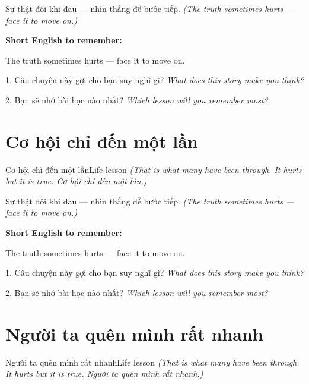 \begin{baihoc}
Sự thật đôi khi đau — nhìn thẳng để bước tiếp.
\textit{(The truth sometimes hurts — face it to move on.)}
\end{baihoc}

\begin{ghinhoanh}
\textbf{Short English to remember:}

The truth sometimes hurts — face it to move on.

\end{ghinhoanh}

\begin{tuhocnhanh}
1. Câu chuyện này gợi cho bạn suy nghĩ gì? \textit{What does this story make you think?}

2. Bạn sẽ nhớ bài học nào nhất? \textit{Which lesson will you remember most?}
\end{tuhocnhanh}
\ngancach


\section{Cơ hội chỉ đến một lần}
\begin{truyen}{Cơ hội chỉ đến một lần}{Life lesson}
\textit{(That is what many have been through. It hurts but it is true. Cơ hội chỉ đến một lần.)}
\end{truyen}

\begin{baihoc}
Sự thật đôi khi đau — nhìn thẳng để bước tiếp.
\textit{(The truth sometimes hurts — face it to move on.)}
\end{baihoc}

\begin{ghinhoanh}
\textbf{Short English to remember:}

The truth sometimes hurts — face it to move on.

\end{ghinhoanh}

\begin{tuhocnhanh}
1. Câu chuyện này gợi cho bạn suy nghĩ gì? \textit{What does this story make you think?}

2. Bạn sẽ nhớ bài học nào nhất? \textit{Which lesson will you remember most?}
\end{tuhocnhanh}
\ngancach


\section{Người ta quên mình rất nhanh}
\begin{truyen}{Người ta quên mình rất nhanh}{Life lesson}
\textit{(That is what many have been through. It hurts but it is true. Người ta quên mình rất nhanh.)}
\end{truyen}


